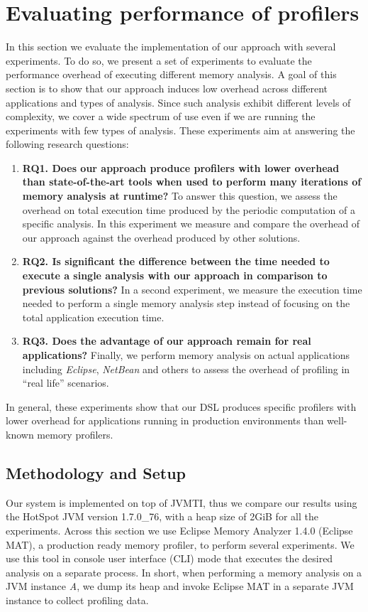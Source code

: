 \section{Evaluating performance of profilers}\label{sec:dsl-evaluation}

In this section we evaluate the implementation of our approach with several experiments.
To do so, we present a set of experiments to evaluate the performance overhead of executing different memory analysis.
A goal of this section is to show that our approach induces low overhead across different applications and types of analysis.
Since such analysis exhibit different levels of complexity, we cover a wide spectrum of use even if we are running the experiments with few types of analysis.
 These experiments aim at answering the following research questions:
\begin{enumerate}
\item \textbf{RQ1. Does our approach produce profilers with lower overhead than state-of-the-art tools when used to perform many iterations of memory analysis at runtime?} To answer this question, we assess the overhead on total execution time produced by the periodic computation of a specific analysis.
In this experiment we measure and compare the overhead of our approach against the overhead produced by other solutions.
\item \textbf{RQ2. Is significant the difference between the time needed to execute a single analysis with our approach in comparison to previous solutions? }
In a second experiment, we measure the execution time needed to perform a single memory analysis step instead of focusing on the total application execution time.
\item \textbf{RQ3. Does the advantage of our approach remain for real applications? }
 Finally, we perform memory analysis on actual applications including \textit{Eclipse}, \textit{NetBean} and others to assess the overhead of profiling in ``real life'' scenarios. 
\end{enumerate}

In general, these experiments show that our DSL produces specific profilers with lower overhead for applications running in production environments than well-known memory profilers.

\subsection{Methodology and Setup}\label{sec:MethodologyAndSetup}
Our system is implemented on top of JVMTI, thus we compare our results using the HotSpot JVM version 1.7.0\_76, with a heap size of 2GiB for all the experiments.
Across this section we use Eclipse Memory Analyzer 1.4.0 (Eclipse MAT),  a production ready memory profiler, to perform several experiments.
We use  this tool in console user interface (CLI) mode that executes the desired analysis on a separate process.
In short, when performing a memory analysis on a JVM instance \textit{A}, we dump its heap and invoke Eclipse MAT in a separate JVM instance to collect profiling data.


